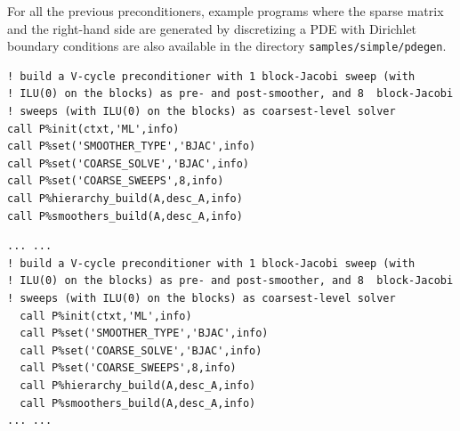 For all the previous preconditioners, example programs where the sparse matrix and
the right-hand side are generated by discretizing a PDE with Dirichlet
boundary conditions are also available in the directory \verb|samples/simple/pdegen|.
\vspace{-1em}\begin{listing}[tbh]
\ifpdf%
\begin{verbatim}
! build a V-cycle preconditioner with 1 block-Jacobi sweep (with
! ILU(0) on the blocks) as pre- and post-smoother, and 8  block-Jacobi
! sweeps (with ILU(0) on the blocks) as coarsest-level solver
call P%init(ctxt,'ML',info)
call P%set('SMOOTHER_TYPE','BJAC',info)
call P%set('COARSE_SOLVE','BJAC',info)
call P%set('COARSE_SWEEPS',8,info)
call P%hierarchy_build(A,desc_A,info)
call P%smoothers_build(A,desc_A,info)
\end{verbatim}
\else%
\begin{center}
\begin{minipage}{.90\textwidth}
{\small
\begin{verbatim}
... ...
! build a V-cycle preconditioner with 1 block-Jacobi sweep (with
! ILU(0) on the blocks) as pre- and post-smoother, and 8  block-Jacobi
! sweeps (with ILU(0) on the blocks) as coarsest-level solver
  call P%init(ctxt,'ML',info)
  call P%set('SMOOTHER_TYPE','BJAC',info)
  call P%set('COARSE_SOLVE','BJAC',info)
  call P%set('COARSE_SWEEPS',8,info)
  call P%hierarchy_build(A,desc_A,info)
  call P%smoothers_build(A,desc_A,info)
... ...
\end{verbatim}
}
\end{minipage}
\end{center}
\fi\vspace{-2em}%
\caption{setup of a multilevel preconditioner based on the default decoupled coarsening\label{fig:ex2}}
\end{listing}\vspace*{-2em}
